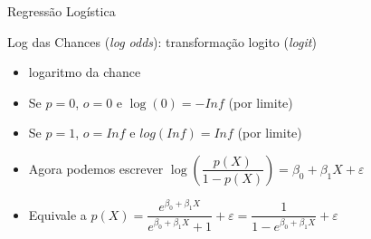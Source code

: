 \documentclass{beamer}\usepackage[]{graphicx}\usepackage[]{color}
\begin{document}
\begin{frame}{Regressão Logística}

Log das Chances (\emph{log odds}): transformação logito (\emph{logit})
\vfill
\begin{itemize}
\item logaritmo da chance
\vfill
\item Se $p = 0$, $o = 0$ e $\log (0) = -Inf$ (por limite)
\vfill
\item Se $p = 1$, $o = Inf$ e $log(Inf) = Inf$ (por limite) \pause
\vfill
\item Agora podemos escrever $\log \left(\dfrac{p(X)}{1-p(X)}\right) = \beta _0 + \beta_1 X + \varepsilon$ \pause
\vfill
\item Equivale a $p(X) = \dfrac{e^{\beta _0 + \beta_1 X}}{e^{\beta _0 + \beta_1 X} + 1} + \varepsilon = \dfrac{1}{1 - e^{\beta _0 + \beta_1 X}} + \varepsilon$
\end{itemize}

\end{frame}
\end{document}
